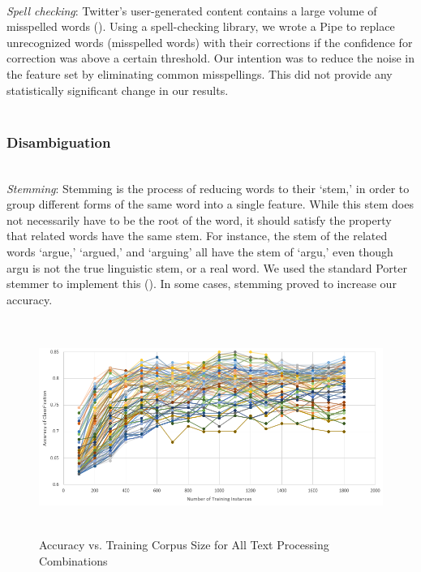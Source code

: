\documentclass[letterpaper]{article}
\begin{document}
~\\
\textit{Spell checking}: Twitter's user-generated content contains a large volume of misspelled words (\citeauthor{Laboreiro:2010:TMM:1871840.1871853}). Using a spell-checking library, we wrote a Pipe to replace unrecognized words (misspelled words) with their corrections if the confidence for correction was above a certain threshold. Our intention was to reduce the noise in the feature set by eliminating common misspellings. This did not provide any statistically significant change in our results. \\
~\\
\subsubsection{Disambiguation}
~\\
\textit{Stemming}: Stemming is the process of reducing words to their `stem,' in order to group different forms of the same word into a single feature. While this stem does not necessarily have to be the root of the word, it should satisfy the property that related words have the same stem. For instance, the stem of the related words `argue,' `argued,' and `arguing' all have the stem of `argu,' even though argu is not the true linguistic stem, or a real word. We used the standard Porter stemmer to implement this (\citeauthor{porter_1980}).
In some cases, stemming proved to increase our accuracy.
\\

\begin{figure}[t!]
\centering
\includegraphics[height=7cm]{chart}
\caption{Accuracy vs. Training Corpus Size for All Text Processing Combinations}
\label{fig:chart}
\end{figure}
\end{document}
